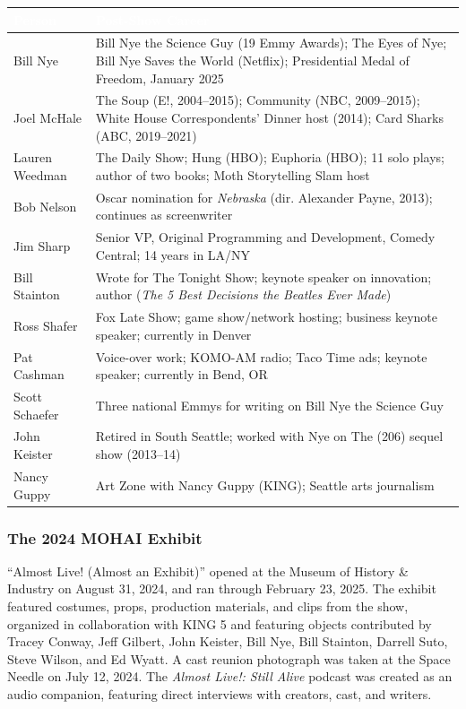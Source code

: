 \documentclass[11pt,letterpaper]{article}
\newcommand{\tableheader}[1]{\textbf{\sffamily\textcolor{white}{#1}}}
\begin{document}
\begin{center}
\begin{tabularx}{\textwidth}{L{3cm}X}
\toprule
{}
\tableheader{Person} & \tableheader{Post-Show Career} \\
\midrule
Bill Nye & Bill Nye the Science Guy (19 Emmy Awards); The Eyes of Nye; Bill Nye Saves the World (Netflix); Presidential Medal of Freedom, January 2025 \\
Joel McHale & The Soup (E!, 2004--2015); Community (NBC, 2009--2015); White House Correspondents' Dinner host (2014); Card Sharks (ABC, 2019--2021) \\
Lauren Weedman & The Daily Show; Hung (HBO); Euphoria (HBO); 11 solo plays; author of two books; Moth Storytelling Slam host \\
Bob Nelson & Oscar nomination for \textit{Nebraska} (dir. Alexander Payne, 2013); continues as screenwriter \\
Jim Sharp & Senior VP, Original Programming and Development, Comedy Central; 14 years in LA/NY \\
Bill Stainton & Wrote for The Tonight Show; keynote speaker on innovation; author (\textit{The 5 Best Decisions the Beatles Ever Made}) \\
Ross Shafer & Fox Late Show; game show/network hosting; business keynote speaker; currently in Denver \\
Pat Cashman & Voice-over work; KOMO-AM radio; Taco Time ads; keynote speaker; currently in Bend, OR \\
Scott Schaefer & Three national Emmys for writing on Bill Nye the Science Guy \\
John Keister & Retired in South Seattle; worked with Nye on The (206) sequel show (2013--14) \\
Nancy Guppy & Art Zone with Nancy Guppy (KING); Seattle arts journalism \\
\bottomrule
\end{tabularx}
\end{center}

\subsubsection{The 2024 MOHAI Exhibit}

``Almost Live! (Almost an Exhibit)'' opened at the Museum of History \& Industry on August 31, 2024, and ran through February 23, 2025. The exhibit featured costumes, props, production materials, and clips from the show, organized in collaboration with KING 5 and featuring objects contributed by Tracey Conway, Jeff Gilbert, John Keister, Bill Nye, Bill Stainton, Darrell Suto, Steve Wilson, and Ed Wyatt. A cast reunion photograph was taken at the Space Needle on July 12, 2024. The \textit{Almost Live!: Still Alive} podcast was created as an audio companion, featuring direct interviews with creators, cast, and writers.
\end{document}
